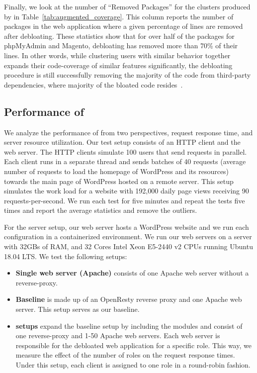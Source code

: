 Finally, we look at the number of ``Removed Packages'' for the clusters produced by \sys{} in Table~\ref{tab:augmented_coverage}. 
This column reports the number of packages in the web application where a given percentage of lines are removed after debloating.
These statistics show that for over half of the packages for phpMyAdmin and Magento, debloating has removed more than 70\% of their lines. 
In other words, while clustering users with similar behavior together expands their code-coverage of similar features significantly, the debloating procedure is still successfully removing the majority of the code from third-party dependencies, where majority of the bloated code resides~\cite{lessismore}.

\subsection{Performance of \sys}

We analyze the performance of \sys{} from two perspectives, request response time, and server resource utilization. 
Our test setup consists of an HTTP client and the web server. 
The HTTP clients simulate 100 users that send requests in parallel. 
Each client runs in a separate thread and sends batches of 40 requests (average number of requests to load the homepage of WordPress and its resources) towards the main page of WordPress hosted on a remote server. 
This setup simulates the work load for a website with 192,000 daily page views receiving 90 requests-per-second. 
We run each test for five minutes and repeat the tests five times and report the average statistics and remove the outliers. 

For the server setup, our web server hosts a WordPress website and we run each configuration in a containerized environment. 
We run our web servers on a server with 32GBs of RAM, and 32 Cores Intel Xeon E5-2440 v2 CPUs running Ubuntu 18.04 LTS. 
We test the following setups:

\begin{itemize}
    \item \textbf{Single web server (Apache)} consists of one Apache web server without a reverse-proxy. 
    \item \textbf{Baseline} is made up of an OpenResty reverse proxy and one Apache web server. This setup serves as our baseline. 
    \item \textbf{\sys{} setups} expand the baseline setup by including the \sys{} modules and consist of one reverse-proxy and 1-50 Apache web servers. Each web server is responsible for the debloated web application for a specific role. This way, we measure the effect of the number of roles on the request response times. Under this setup, each client is assigned to one role in a round-robin fashion.
\end{itemize}


